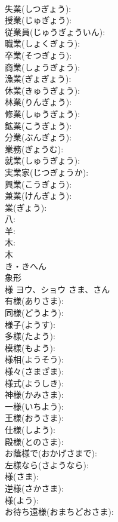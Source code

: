 \documentclass[8pt]{extreport}
\begin{document}
\begin{CJK}{UTF8}{min}
\\	失業(しつぎょう): 
\\	授業(じゅぎょう): 
\\	従業員(じゅうぎょういん): 
\\	職業(しょくぎょう): 
\\	卒業(そつぎょう): 
\\	商業(しょうぎょう): 
\\	漁業(ぎょぎょう): 
\\	休業(きゅうぎょう): 
\\	林業(りんぎょう): 
\\	修業(しゅうぎょう): 
\\	鉱業(こうぎょう): 
\\	分業(ぶんぎょう): 
\\	業務(ぎょうむ): 
\\	就業(しゅうぎょう): 
\\	実業家(じつぎょうか): 
\\	興業(こうぎょう): 
\\	兼業(けんぎょう): 
\\	業(ぎょう): 
\\	八: 
\\	羊: 
\\	木: 
\\	木	
\\	き・きへん	
\\	象形 
\\	様	ヨウ、ショウ	さま、さん		
\\	有様(ありさま): 
\\	同様(どうよう): 
\\	様子(ようす): 
\\	多様(たよう): 
\\	模様(もよう): 
\\	様相(ようそう): 
\\	様々(さまざま): 
\\	様式(ようしき): 
\\	神様(かみさま): 
\\	一様(いちよう): 
\\	王様(おうさま): 
\\	仕様(しよう): 
\\	殿様(とのさま): 
\\	お蔭様で(おかげさまで): 
\\	左様なら(さようなら): 
\\	様(さま): 
\\	逆様(さかさま): 
\\	様(よう): 
\\	お待ち遠様(おまちどおさま): 

\end{CJK}
\end{document}

